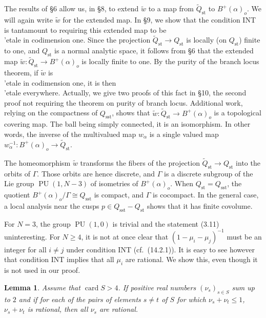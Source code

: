 \documentclass[12pt,a4paper]{article}
\theoremstyle{plain}
\newtheorem{lemma}[theorem]{Lemma}
\theoremstyle{definition}
\theoremstyle{remark}
\DeclareMathOperator{\card}{card}
\DeclareMathOperator{\PU}{PU}
\numberwithin{equation}{section}
\begin{document}
The results of \S 6 allow us, in \S 8, to extend $\widetilde{w}$ to a map from $\widetilde{Q}_{\mathrm{st}}$ to $B^+(\alpha)_o$. We will again write $\widetilde{w}$ for the extended map. In \S 9, we show that the condition INT is tantamount to requiring this extended map to be \\'etale in codimension one. Since the projection $\widetilde{Q}_{\mathrm{st}} \to Q_{\mathrm{st}}$ is locally (on $Q_{\mathrm{st}}$) finite to one, and $Q_{\mathrm{st}}$ is a normal analytic space, it follows from \S 6 that the extended map $\widetilde{w}: \widetilde{Q}_{\mathrm{st}} \to B^+(\alpha)_o$ is locally finite to one. By the purity of the branch locus theorem, if $\widetilde{w}$ is \\'etale in codimension one, it is then \\'etale everywhere. Actually, we give two proofs of this fact in \S 10, the second proof not requiring the theorem on purity of branch locus. Additional work, relying on the compactness of $Q_{\mathrm{sst}}$, shows that $\widetilde{w}: \widetilde{Q}_{\mathrm{st}} \to B^+(\alpha)_o$ is a topological covering map. The ball being simply connected, it is an isomorphism. In other words, the inverse of the multivalued map $w_\alpha$ is a single valued map $w_\alpha^{-1}: B^+(\alpha)_o \to \widetilde{Q}_{\mathrm{st}}$.

The homeomorphism $\widetilde{w}$ transforms the fibers of the projection $\widetilde{Q}_{\mathrm{st}} \to Q_{\mathrm{st}}$ into the orbits of $\Gamma$. Those orbits are hence discrete, and $\Gamma$ is a discrete subgroup of the Lie group $\PU(1, N-3)$ of isometries of $B^+(\alpha)_o$. When $Q_{\mathrm{st}} = Q_{\mathrm{sst}}$, the quotient $B^+(\alpha)_o/\Gamma \cong Q_{\mathrm{sst}}$ is compact, and $\Gamma$ is cocompact. In the general case, a local analysis near the cusps $p \in Q_{\mathrm{sst}} - Q_{\mathrm{st}}$ shows that it has finite covolume.

For $N = 3$, the group $\PU(1, 0)$ is trivial and the statement (3.11) uninteresting. For $N \geq 4$, it is not at once clear that $(1-\mu_i-\mu_j)^{-1}$ must be an integer for all $i \neq j$ under condition INT (cf.\ (14.2.1)). It is easy to see however that condition INT implies that all $\mu_i$ are rational. We show this, even though it is not used in our proof.

\begin{lemma}\label{lem:3.12}
Assume that $\card S > 4$. If positive real numbers $(\nu_s)_{s \in S}$ sum up to $2$ and if for each of the pairs of elements $s \neq t$ of $S$ for which $\nu_s + \nu_t \leq 1$, $\nu_s + \nu_t$ is rational, then all $\nu_s$ are rational.
\end{lemma}
\end{document}
